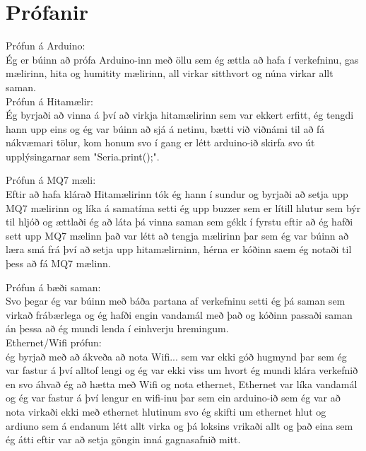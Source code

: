 \section{Prófanir}
Prófun á Arduino: \\
Ég er búinn að prófa Arduino-inn með öllu sem ég ættla að hafa í verkefninu, gas mælirinn, hita og humitity mælirinn, all virkar sitthvort og núna virkar allt saman. \\

Prófun á Hitamælir: \\
Ég byrjaði að vinna á því að virkja hitamælirinn sem var ekkert erfitt, ég tengdi hann upp eins og ég var búinn að sjá á netinu, bætti við viðnámi til að fá nákvæmari tölur, kom honum svo í gang er létt arduino-ið skirfa svo út upplýsingarnar sem "Seria.print();". \\
\begingroup

\endgroup
Prófun á MQ7 mæli: \\
Eftir að hafa klárað Hitamælirinn tók ég hann í sundur og byrjaði að setja upp MQ7 mælirinn og líka á samatíma setti ég upp buzzer sem er lítill hlutur sem býr til hljóð og ættlaði ég að láta þá vinna saman sem gékk í fyrstu eftir að ég hafði sett upp MQ7 mælinn það var létt að tengja mælirinn þar sem ég var búinn að læra smá frá því að setja upp hitamælirninn, hérna er kóðinn saem ég notaði til þess að fá MQ7 mælinn. \\
\begingroup

\endgroup

Prófun á bæði saman: \\
Svo þegar ég var búinn með báða partana af verkefninu setti ég þá saman sem virkað frábærlega og ég hafði engin vandamál með það og kóðinn passaði saman án þessa að ég mundi lenda í einhverju hremingum. \\

Ethernet/Wifi prófun: \\
ég byrjað með að ákveða að nota Wifi... sem var ekki góð hugmynd þar sem ég var fastur á því alltof lengi og ég var ekki viss um hvort ég mundi klára verkefnið en svo áhvað ég að hætta með Wifi og nota ethernet, Ethernet var líka vandamál og ég var fastur á því lengur en wifi-inu þar sem ein arduino-ið sem ég var að nota virkaði ekki með ethernet hlutinum svo ég skifti um ethernet hlut og ardiuno sem á endanum létt allt virka og þá loksins vrikaði allt og það eina sem ég átti eftir var að setja göngin inná gagnasafnið mitt. \\